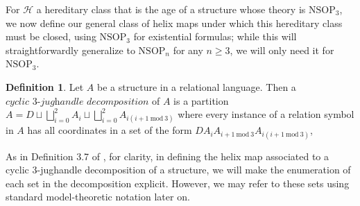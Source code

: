 \documentclass{amsart}
\theoremstyle{definition}
\newtheorem{definition}[theorem]{Definition}
\theoremstyle{remark}
\numberwithin{equation}{section}
\begin{document}
For $\mathcal{H}$ a hereditary class that is the age of a structure whose theory is $\mathrm{NSOP}_{3}$, we now define our general class of helix maps under which this hereditary class must be closed, using $\mathrm{NSOP}_{3}$ for existential formulas; while this will straightforwardly generalize to $\mathrm{NSOP}_{n}$ for any $n \geq 3$, we will only need it for $\mathrm{NSOP}_{3}$. 


\begin{definition}
    \label{jughandle decomposition} Let $A$ be a structure in a relational language. Then a $\textit{cyclic $3$-jughandle decomposition}$ of $A$ is a partition $A= D \sqcup \bigsqcup^{2}_{i = 0} A_{i} \sqcup \bigsqcup^{2}_{i = 0} A_{i(i+1\mathrm{\:mod\:} 3)}$ where every instance of a relation symbol in $A$ has all coordinates in a set of the form $DA_{i}A_{i+1 \mathrm{\:mod\:}3}A_{i(i+1\mathrm{\:mod\:} 3)}$,
\end{definition}


As in Definition 3.7 of \cite{ApproxOrder}, for clarity, in defining the helix map associated to a cyclic $3$-jughandle decomposition of a structure, we will make the enumeration of each set in the decomposition explicit. However, we may refer to these sets using standard model-theoretic notation later on.
\end{document}
